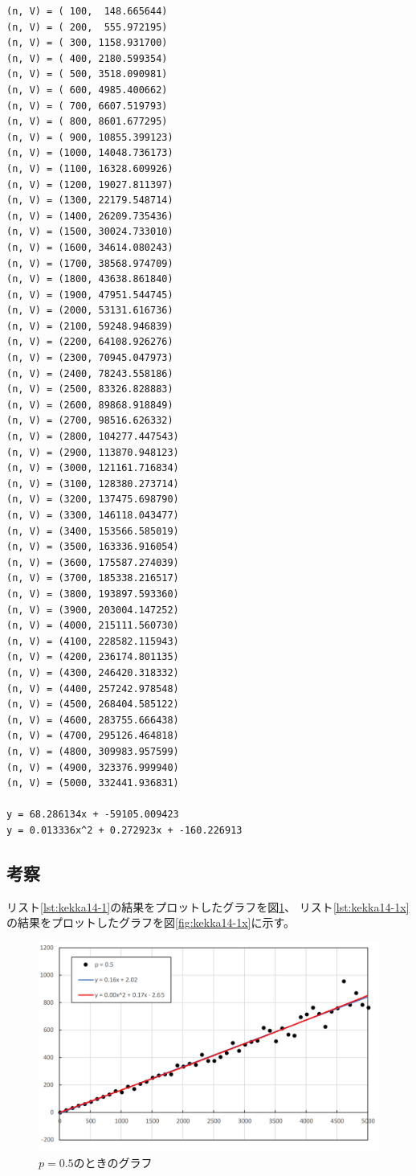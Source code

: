 \documentclass[a4j,titlepage]{jsarticle}
\begin{document}
\begin{lstlisting}[style=text,caption=pが0.7のときの実行結果,label=lst:kekka14-1x]
(n, V) = ( 100,  148.665644)
(n, V) = ( 200,  555.972195)
(n, V) = ( 300, 1158.931700)
(n, V) = ( 400, 2180.599354)
(n, V) = ( 500, 3518.090981)
(n, V) = ( 600, 4985.400662)
(n, V) = ( 700, 6607.519793)
(n, V) = ( 800, 8601.677295)
(n, V) = ( 900, 10855.399123)
(n, V) = (1000, 14048.736173)
(n, V) = (1100, 16328.609926)
(n, V) = (1200, 19027.811397)
(n, V) = (1300, 22179.548714)
(n, V) = (1400, 26209.735436)
(n, V) = (1500, 30024.733010)
(n, V) = (1600, 34614.080243)
(n, V) = (1700, 38568.974709)
(n, V) = (1800, 43638.861840)
(n, V) = (1900, 47951.544745)
(n, V) = (2000, 53131.616736)
(n, V) = (2100, 59248.946839)
(n, V) = (2200, 64108.926276)
(n, V) = (2300, 70945.047973)
(n, V) = (2400, 78243.558186)
(n, V) = (2500, 83326.828883)
(n, V) = (2600, 89868.918849)
(n, V) = (2700, 98516.626332)
(n, V) = (2800, 104277.447543)
(n, V) = (2900, 113870.948123)
(n, V) = (3000, 121161.716834)
(n, V) = (3100, 128380.273714)
(n, V) = (3200, 137475.698790)
(n, V) = (3300, 146118.043477)
(n, V) = (3400, 153566.585019)
(n, V) = (3500, 163336.916054)
(n, V) = (3600, 175587.274039)
(n, V) = (3700, 185338.216517)
(n, V) = (3800, 193897.593360)
(n, V) = (3900, 203004.147252)
(n, V) = (4000, 215111.560730)
(n, V) = (4100, 228582.115943)
(n, V) = (4200, 236174.801135)
(n, V) = (4300, 246420.318332)
(n, V) = (4400, 257242.978548)
(n, V) = (4500, 268404.585122)
(n, V) = (4600, 283755.666438)
(n, V) = (4700, 295126.464818)
(n, V) = (4800, 309983.957599)
(n, V) = (4900, 323376.999940)
(n, V) = (5000, 332441.936831)

y = 68.286134x + -59105.009423
y = 0.013336x^2 + 0.272923x + -160.226913
\end{lstlisting}

\subsection{考察}
リスト\ref{lst:kekka14-1}の結果をプロットしたグラフを図\ref{fig:kekka14-1}、
リスト\ref{lst:kekka14-1x}の結果をプロットしたグラフを図\ref{fig:kekka14-1x}に示す。

\begin{figure}[H]
  \centering
  \includegraphics[width=13cm]{kadai14-1-5.png}
  \caption{$p=0.5$のときのグラフ}
  \label{fig:kekka14-1}
\end{figure}
\end{document}
